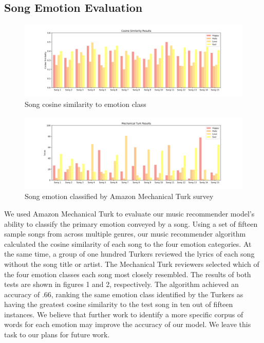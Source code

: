 \documentclass[10pt,twocolumn]{article}
\begin{document}
\subsection{Song Emotion Evaluation}

\begin{figure}[!ht]
\centering
\includegraphics[width=570pt]{test_cos.png}
\caption{Song cosine similarity to emotion class}
\label{fig:digraph}
\end{figure}
\begin{figure}[!ht]
\centering
\includegraphics[width=570pt]{test_vote.png}
\caption{Song emotion classified by Amazon Mechanical Turk survey}
\label{fig:digraph}
\end{figure}

We used Amazon Mechanical Turk to evaluate our music recommender model's ability to classify the primary emotion conveyed by a song. Using a set of fifteen sample songs from across multiple genres, our music recommender algorithm calculated the cosine similarity of each song to the four emotion categories. At the same time, a group of one hundred Turkers reviewed the lyrics of each song without the song title or artist.  The Mechanical Turk reviewers selected which of the four emotion classes each song most closely resembled. The results of both tests are shown in figures 1 and 2, respectively. The algorithm achieved an accuracy of .66, ranking the same emotion class identified by the Turkers as having the greatest cosine similarity to the test song in ten out of fifteen instances.  We believe that further work to identify a more specific corpus of words for each emotion may improve the accuracy of our model.  We leave this task to our plans for future work.
\end{document}
